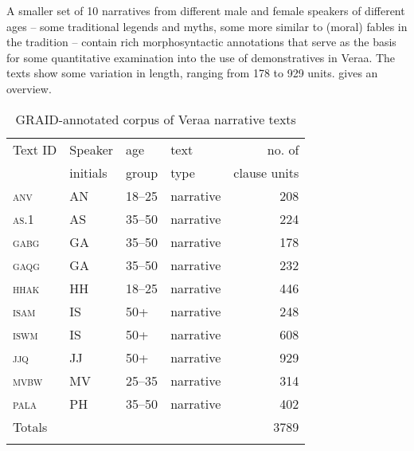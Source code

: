 \documentclass[output=paper
,modfonts
,nonflat]{langsci/langscibook}
\begin{document}
A smaller set of  10 narratives from different male and female speakers of different ages -- some traditional legends and myths, some more similar to (moral) fables in the  tradition -- contain rich morphosyntactic annotations that serve as the basis for some quantitative examination into the use of demonstratives in Vera{\textquotesingle}a. The texts show some variation in length, ranging from 178 to 929  units.  gives an overview.

\begin{table}
\caption{GRAID-annotated corpus of Vera{\textquotesingle}a narrative texts}
\label{table1}
 \begin{tabular}{llllr} 
  \lsptoprule
    {Text ID} & {Speaker} & {age} 	& {text} 		& {no. of} \\
    & {initials} & {group} & {type}	&	{clause units}		\\
  \midrule
    
\textsc{anv} 		&	AN	& 18--25		& narrative &	208 \\
\textsc{as.1}			&	AS		& 35--50	&	narrative	&	224 \\
\textsc{gabg} & GA		& 35--50	&	narrative	& 178 \\
\textsc{gaqg} &	GA	&	35--50	&	narrative	& 232 \\
\textsc{hhak} &	HH	&	18--25		&	narrative	& 446 \\
\textsc{isam}	& 	IS			&	\phantom{25--}50+				&	narrative	& 248 \\
\textsc{iswm}	& IS			& \phantom{25--}50+				&	narrative	& 608 \\
\textsc{jjq} 			&	JJ				& \phantom{25--}50+				&	narrative	& 929 \\
\textsc{mvbw} &	MV	&	25--35		&	narrative	& 314 \\
\textsc{pala} 		&	PH		&	35--50	&	narrative	& 402 \\
		\midrule
{Totals}	& &&&			{3789} \\
  \lspbottomrule
 \end{tabular}
\end{table}
\end{document}
